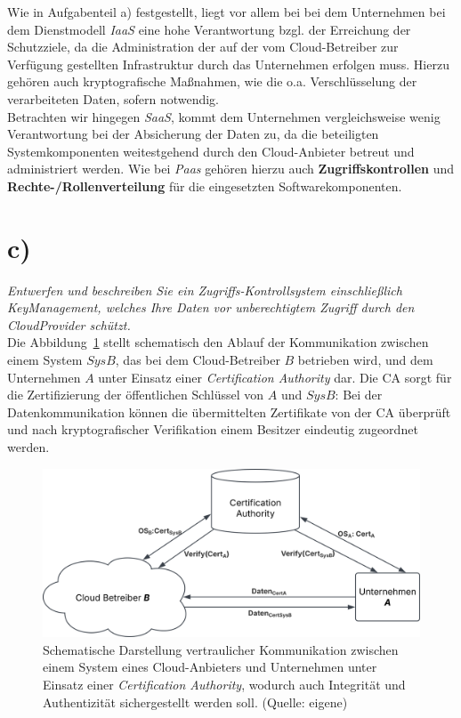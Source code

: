 \noindent
Wie in Aufgabenteil a) festgestellt, liegt vor allem bei bei dem Unternehmen bei dem Dienstmodell \textit{IaaS} eine hohe Verantwortung bzgl. der Erreichung der Schutzziele, da die Administration der auf der vom Cloud-Betreiber zur Verfügung gestellten Infrastruktur durch das Unternehmen erfolgen muss.
Hierzu gehören auch kryptografische Maßnahmen, wie die o.a. Verschlüsselung der verarbeiteten Daten, sofern notwendig.\\
Betrachten wir hingegen \textit{SaaS}, kommt dem Unternehmen vergleichsweise wenig Verantwortung bei der Absicherung der Daten zu, da die beteiligten Systemkomponenten weitestgehend durch den Cloud-Anbieter betreut und administriert werden.
Wie bei \textit{Paas} gehören hierzu auch \textbf{Zugriffskontrollen} und \textbf{Rechte-/Rollenverteilung} für die eingesetzten Softwarekomponenten.


\section{c)}

\textit{Entwerfen und beschreiben Sie ein Zugriffs-Kontrollsystem einschließlich KeyManagement, welches Ihre Daten vor unberechtigtem Zugriff durch den CloudProvider schützt.}\\

\noindent
Die Abbildung~\ref{fig:cloudkomm} stellt schematisch den Ablauf der Kommunikation zwischen einem System $SysB$, das bei dem Cloud-Betreiber $B$ betrieben wird, und dem Unternehmen $A$ unter Einsatz einer \textit{Certification Authority} dar.
Die CA sorgt für die Zertifizierung der öffentlichen Schlüssel von $A$ und $SysB$: Bei der Datenkommunikation können die übermittelten Zertifikate von der CA überprüft und nach kryptografischer Verifikation einem Besitzer eindeutig zugeordnet werden.

\begin{figure}
    \centering
    \includegraphics[scale=0.4]{aufgabe 3/img/cloudkomm.svg}
    \caption{Schematische Darstellung vertraulicher Kommunikation zwischen einem System eines Cloud-Anbieters und Unternehmen unter Einsatz einer \textit{Certification Authority}, wodurch auch Integrität und Authentizität sichergestellt werden soll. (Quelle: eigene)}
    \label{fig:cloudkomm}
\end{figure}

